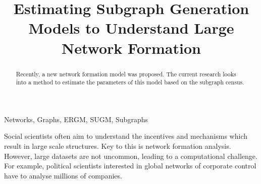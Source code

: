 \documentclass[conference]{IEEEtran}
\begin{document}
\title{Estimating Subgraph Generation Models to Understand Large Network Formation}

\author{
\and
{}
}

\maketitle

\begin{abstract}
Recently, a new network formation model was proposed. The current research looks into a method to estimate the parameters of this model based on the subgraph census.
\end{abstract}

\begin{IEEEkeywords}
Networks, Graphs, ERGM, SUGM, Subgraphs
\end{IEEEkeywords}


Social scientists often aim to understand the incentives and mechanisms which result in large scale structures. Key to this is network formation analysis. However, large datasets are not uncommon, leading to a computational challenge. For example, political scientists interested in global networks of corporate control have to analyse millions of companies.
\end{document}
